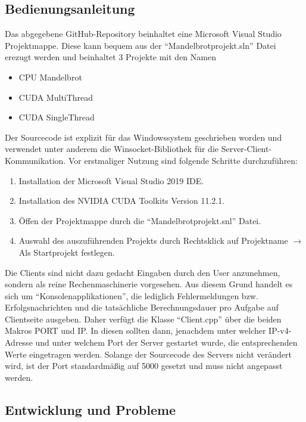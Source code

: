 \documentclass[12pt, onecolumn, notitlepage]{scrartcl}
\begin{document}
\subsection{Bedienungsanleitung}
Das abgegebene GitHub-Repository beinhaltet eine Microsoft Visual Studio Projektmappe. Diese kann bequem aus der 
\enquote{Mandelbrotprojekt.sln} Datei erezugt werden und beinhaltet 3 Projekte mit den Namen 
\begin{itemize}
	\itemsep0pt
	\item CPU Mandelbrot
	\item CUDA MultiThread 
	\item CUDA SingleThread
\end{itemize}

Der Sourcecode ist explizit für das Windowssystem geschrieben worden und verwendet unter anderem die Winsocket-Bibliothek für die Server-Client-Kommunikation. 
Vor erstmaliger Nutzung sind folgende Schritte durchzuführen: 
\begin{enumerate}
	\setlength\itemsep{0.07em}
	\item Installation der Microsoft Visual Studio 2019 IDE.
	\item Installation des NVIDIA CUDA Toolkits Version 11.2.1.
	\item Öffen der Projektmappe durch die \enquote{Mandelbrotprojekt.snl} Datei.
	\item Auswahl des auszuführenden Projekts durch Rechtsklick auf Projektname $\rightarrow$ Als Startprojekt festlegen.
\end{enumerate}

Die Clients sind nicht dazu gedacht Eingaben durch den User anzunehmen, sondern als reine Rechenmaschinerie vorgesehen.
Aus diesem Grund handelt es sich um \enquote{Konsolenapplikationen}, die lediglich Fehlermeldungen bzw. Erfolgsnachrichten und die tatsächliche Berechnungsdauer pro Aufgabe auf Clientseite ausgeben.
Daher verfügt die Klasse \enquote{Client.cpp} über die beiden Makros PORT und IP. In diesen sollten dann, jenachdem unter welcher IP-v4-Adresse und unter welchem Port der Server gestartet wurde, die entsprechenden Werte eingetragen werden. Solange der Sourcecode des Servers nicht verändert wird, ist der Port standardmäßig auf 5000 gesetzt und muss  nicht angepasst werden.

\subsection{Entwicklung und Probleme}
\end{document}
